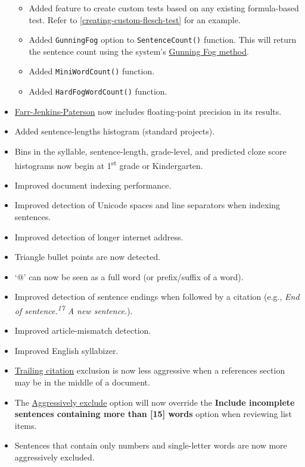 \documentclass[
]{book}
\providecommand{\tightlist}{%
  \setlength{\itemsep}{0pt}\setlength{\parskip}{0pt}}
\theoremstyle{definition}
\theoremstyle{definition}
\theoremstyle{definition}
\theoremstyle{definition}
\theoremstyle{remark}
\begin{document}
\begin{itemize}
  \begin{itemize}
  \tightlist
  \item
    Added feature to create custom tests based on any existing formula-based test. Refer to \ref{creating-custom-flesch-test} for an example.
  \item
    Added \texttt{GunningFog} option to \texttt{SentenceCount()} function. This will return the sentence count using the system's \protect\hyperlink{options-gunning-fog}{Gunning Fog method}.
  \item
    Added \texttt{MiniWordCount()} function.
  \item
    Added \texttt{HardFogWordCount()} function.
  \end{itemize}
\item
  \protect\hyperlink{farr-jenkins-paterson}{Farr-Jenkins-Paterson} now includes floating-point precision in its results.
\item
  Added sentence-lengths histogram (standard projects).
\item
  Bins in the syllable, sentence-length, grade-level, and predicted cloze score histograms now begin at 1\textsuperscript{st} grade or Kindergarten.
\item
  Improved document indexing performance.
\item
  Improved detection of Unicode spaces and line separators when indexing sentences.
\item
  Improved detection of longer internet address.
\item
  Triangle bullet points are now detected.
\item
  `@' can now be seen as a full word (or prefix/suffix of a word).
\item
  Improved detection of sentence endings when followed by a citation (e.g., \emph{End of sentence.\textsuperscript{17} A new sentence.}).
\item
  Improved article-mismatch detection.
\item
  Improved English syllabizer.
\item
  \protect\hyperlink{options-text-exclusion}{Trailing citation} exclusion is now less aggressive when a references section may be in the middle of a document.
\item
  The \protect\hyperlink{options-text-exclusion}{Aggressively exclude} option will now override the \textbf{Include incomplete sentences containing more than {[}15{]} words} option when reviewing list items.
\item
  Sentences that contain only numbers and single-letter words are now more aggressively excluded.

\end{itemize}
\end{document}
